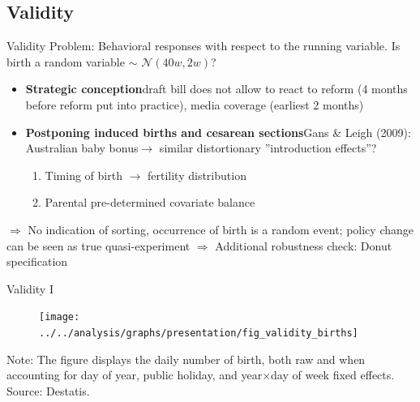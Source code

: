 \documentclass[aspectratio=169,handout]{beamer} %
\begin{document}
\subsection*{Validity}
\label{VALIDITY}
\begin{frame}{Validity}
Problem: Behavioral responses with respect to the running variable. Is birth a random variable $\sim$ $\mathcal{N}(40w,2w)$?
\begin{itemize}
\item \textbf{Strategic conception}\newline draft bill does not allow to react to reform (4 months before reform put into practice), media coverage (earliest 2 months)

\item \textbf{Postponing induced births and cesarean sections}\newline Gans \& Leigh (2009): Australian baby bonus\newline $\rightarrow$ similar distortionary ”introduction effects”?



\begin{enumerate}
\item Timing of birth $\rightarrow$ fertility distribution
\item Parental pre-determined covariate balance
\end{enumerate}
\end{itemize}
\medskip
$\Rightarrow$ No indication of sorting, occurrence of birth is a random event; policy change can be seen as true quasi-experiment \newline $\Rightarrow$ Additional robustness check: Donut specification

 \hyperlink{BACK_FROM_VALIDITY}{}

\end{frame}
\begin{frame}{Validity I}
	\begin{figure}
		\texttt{[image: ../../analysis/graphs/presentation/fig\_validity\_births]}
	\end{figure}
	\begin{center}\vspace{-1em}
		\tiny \flushleft Note:  The figure displays the daily number of birth, both raw and when accounting for day of year, public holiday, and year$\times$day of week fixed effects. Source: Destatis.
	\end{center}
	\hyperlink{BACK_FROM_VALIDITY}{}
\end{frame}
\end{document}
